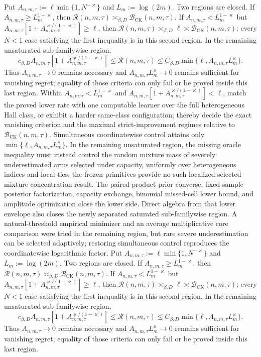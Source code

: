 Put \(A_{n,m,\tau}:=\ell\min\{1,N^{-\varkappa}\}\) and \(L_m:=\log(2m)\). Two regions are closed. If \(A_{n,m,\tau}\ge L_m^{1-\varkappa}\), then \(\mathcal R(n,m,\tau)\asymp_{\beta,D}\mathcal B_{\mathrm{CK}}(n,m,\tau)\). If \(A_{n,m,\tau}<L_m^{1-\varkappa}\) but \(A_{n,m,\tau}[1+A_{n,m,\tau}^{\varkappa/(1-\varkappa)}]\ge\ell\), then \(\mathcal R(n,m,\tau)\asymp_{\beta,D}\ell\asymp\mathcal B_{\mathrm{CK}}(n,m,\tau)\); every \(N<1\) case satisfying the first inequality is in this second region. In the remaining unsaturated sub-familywise region,
\[
c_{\beta,D}A_{n,m,\tau}\left[1+A_{n,m,\tau}^{\varkappa/(1-\varkappa)}\right]
\le\mathcal R(n,m,\tau)
\le C_{\beta,D}\min\{\ell,A_{n,m,\tau}L_m^{\varkappa}\}.
\]
Thus \(A_{n,m,\tau}\to0\) remains necessary and \(A_{n,m,\tau}L_m^{\varkappa}\to0\) remains sufficient for vanishing regret; equality of those criteria can only fail or be proved inside this last region.
Within \(A_{n,m,\tau}<L_m^{1-\varkappa}\) and \(A_{n,m,\tau}[1+A_{n,m,\tau}^{\varkappa/(1-\varkappa)}]<\ell\), match the proved lower rate with one computable learner over the full heterogeneous Hall class, or exhibit a harder same-class configuration; thereby decide the exact vanishing criterion and the maximal strict-improvement regimes relative to \(\mathcal B_{\mathrm{CK}}(n,m,\tau)\).
Simultaneous coordinatewise control attains only \(\min\{\ell,A_{n,m,\tau}L_m^{\varkappa}\}\). In the remaining unsaturated region, the missing oracle inequality must instead control the random mixture mass of severely underestimated arms selected under capacity, uniformly over heterogeneous indices and local ties; the frozen primitives provide no such localized selected-mixture concentration result.
The paired product-prior converse, fixed-sample posterior factorization, capacity exchange, binomial missed-cell lower bound, and amplitude optimization close the lower side. Direct algebra from that lower envelope also closes the newly separated saturated sub-familywise region. A natural-threshold empirical minimizer and an average multiplicative core comparison were tried in the remaining region, but rare severe underestimation can be selected adaptively; restoring simultaneous control reproduces the coordinatewise logarithmic factor.
Put \(A_{n,m,\tau}:=\ell\min\{1,N^{-\varkappa}\}\) and \(L_m:=\log(2m)\). Two regions are closed. If \(A_{n,m,\tau}\ge L_m^{1-\varkappa}\), then \(\mathcal R(n,m,\tau)\asymp_{\beta,D}\mathcal B_{\mathrm{CK}}(n,m,\tau)\). If \(A_{n,m,\tau}<L_m^{1-\varkappa}\) but \(A_{n,m,\tau}[1+A_{n,m,\tau}^{\varkappa/(1-\varkappa)}]\ge\ell\), then \(\mathcal R(n,m,\tau)\asymp_{\beta,D}\ell\asymp\mathcal B_{\mathrm{CK}}(n,m,\tau)\); every \(N<1\) case satisfying the first inequality is in this second region. In the remaining unsaturated sub-familywise region,
\[
c_{\beta,D}A_{n,m,\tau}\left[1+A_{n,m,\tau}^{\varkappa/(1-\varkappa)}\right]
\le\mathcal R(n,m,\tau)
\le C_{\beta,D}\min\{\ell,A_{n,m,\tau}L_m^{\varkappa}\}.
\]
Thus \(A_{n,m,\tau}\to0\) remains necessary and \(A_{n,m,\tau}L_m^{\varkappa}\to0\) remains sufficient for vanishing regret; equality of those criteria can only fail or be proved inside this last region.
